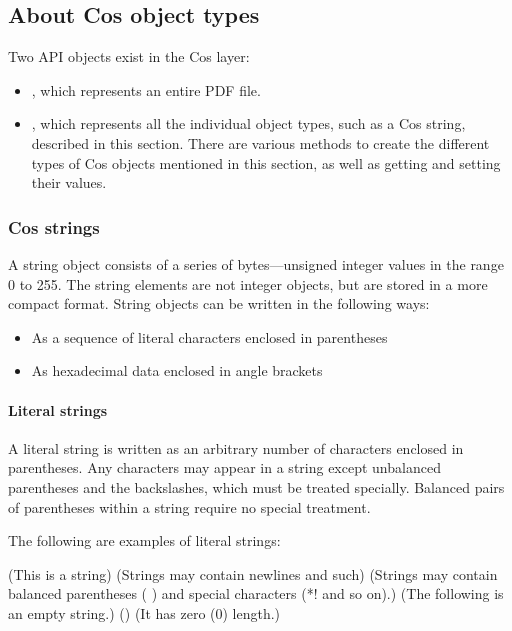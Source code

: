 \documentclass[letterpaper,12pt,english,openany,oneside]{sphinxmanual}
\begin{document}
\subsection{About Cos object types}
\label{\detokenize{Plugins_Cos:about-cos-object-types}}
Two API objects exist in the Cos layer:
\begin{itemize}
\item {} 
, which represents an entire PDF file.

\item {} 
, which represents all the individual object types, such as a Cos string, described in this section. There are various methods to create the different types of Cos objects mentioned in this section, as well as getting and setting their values.

\end{itemize}


\subsubsection{Cos strings}
\label{\detokenize{Plugins_Cos:cos-strings}}
A string object consists of a series of bytes—unsigned integer values in the range 0 to 255. The string elements are not integer objects, but are stored in a more compact format. String objects can be written in the following ways:
\begin{itemize}
\item {} 
As a sequence of literal characters enclosed in parentheses

\item {} 
As hexadecimal data enclosed in angle brackets

\end{itemize}


\paragraph{Literal strings}
\label{\detokenize{Plugins_Cos:literal-strings}}
A literal string is written as an arbitrary number of characters enclosed in parentheses. Any characters may appear in a string except unbalanced parentheses and the backslashes, which must be treated specially. Balanced pairs of parentheses within a string require no special treatment.

The following are examples of literal strings:

\begin{sphinxVerbatim}[commandchars=\\\{\}]
(This is a string)
(Strings may contain newlines
and such)
(Strings may contain balanced parentheses ( ) and
special characters (*!\PYGZam{}\PYGZcb{}\PYGZca{}\PYGZpc{} and so on).)
(The following is an empty string.)
()
(It has zero (0) length.)
\end{sphinxVerbatim}
\end{document}
